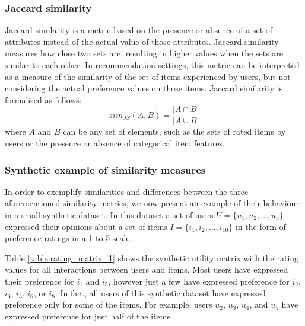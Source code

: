 \subsubsection*{Jaccard similarity}\label{subsubsection:jaccard_similarity}
Jaccard similarity is a metric based on the presence or absence of a set of attributes instead of the actual value of those attributes. Jaccard similarity measures how close two sets are, resulting in higher values when the sets are similar to each other. 
In recommendation settings, this metric can be interpreted as a measure of the similarity of the set of items experienced by users, but not considering the actual preference values on those items. Jaccard similarity is formalised as follows:
\begin{equation}
\label{eq:jaccard_similarity}
sim_{JS}({A,B}) =
\frac{
|A\cap B|
}{
|A\cup B|
}
\end{equation}
where $A$ and $B$ can be any set of elements, such as the sets of rated items by users or the presence or absence of categorical item features. 






\subsubsection*{Synthetic example of similarity measures}
In order to exemplify similarities and differences between the three aforementioned similarity metrics, we now present an example of their behaviour in a small synthetic dataset.
In this dataset a set of users $U=\{u_{1}, u_{2}, \ldots ,u_{5}\}$ expressed their opinions about a set of items $I =\{i_{1},i_{2}, \ldots ,i_{10}\}$ in the form of preference ratings in a 1-to-5 scale. 


Table \ref{table:rating_matrix_1} shows the synthetic utility matrix with the rating values for all interactions between users and items.
Most users have expressed their preference for $i_{1}$ and $i_{5}$, however just a few have expressed preference for $i_{2}$, $i_{3}$, $i_{3}$, $i_{6}$, or $i_{8}$. 
In fact, all users of this synthetic dataset have expressed preference only for some of the items. For example, users $u_{2}$, $u_{3}$, $u_{4}$, and $u_{5}$ have expressed preference for just half of the items. 

